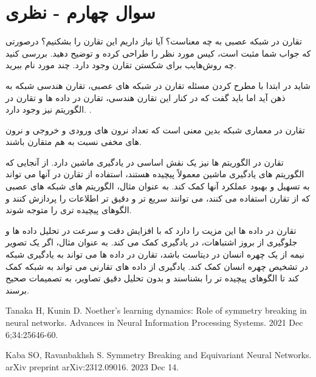 \section{سوال چهارم - نظری}
تقارن در شبکه عصبی به چه معناست؟ آیا نیاز داریم این تقارن را بشکنیم؟ درصورتی که جواب شما مثبت است، کیس مورد نظر را طراحی کرده و توضیح دهید. بررسی کنید چه روش‌هایب برای شکستن تقارن وجود دارد. چند مورد نام ببرید.





\begin{qsolve}
 	شاید در ابتدا با مطرح کردن مسئله تقارن در شبکه های عصبی، تقارن هندسی شبکه به ذهن آید اما باید گفت که در کنار این تقارن هندسی، تقارن در داده ها و تقارن در الگوریتم نیز وجود دارد. \cite{ref1}.
 	
 	تقارن در معماری شبکه بدین معنی است که تعداد نرون های ورودی و خروجی و نرون های مخفی نسبت به هم متقارن باشند. 
 	
 	تقارن در الگوریتم ها نیز یک نقش اساسی در یادگیری ماشین دارد. از آنجایی که الگوریتم های یادگیری ماشین معمولاً پیچیده هستند، استفاده از تقارن در آنها می تواند به تسهیل و بهبود عملکرد آنها کمک کند. به عنوان مثال، الگوریتم های شبکه های عصبی که از تقارن استفاده می کنند، می توانند سریع تر و دقیق تر اطلاعات را پردازش کنند و الگوهای پیچیده تری را متوجه شوند.
 	
 	تقارن در داده ها این مزیت را دارد که با افزایش دقت و سرعت در تحلیل داده ها و جلوگیری از بروز اشتباهات، در یادگیری کمک می کند. به عنوان مثال، اگر یک تصویر نیمه از یک چهره انسان در دیتاست باشد، تقارن در داده ها می تواند به یادگیری شبکه در تشخیص چهره انسان کمک کند. یادگیری از داده های تقارنی می تواند به شبکه کمک کند تا الگوهای پیچیده تر را بشناسند و بدون تحلیل دقیق تصاویر، به تصمیمات صحیح برسند.
 	
 	



\end{qsolve}

















\begin{latin}
	\begin{thebibliography}{9}
		Tanaka H, Kunin D. Noether’s learning dynamics: Role of symmetry breaking in neural networks. Advances in Neural Information Processing Systems. 2021 Dec 6;34:25646-60.
		
		Kaba SO, Ravanbakhsh S. Symmetry Breaking and Equivariant Neural Networks. arXiv preprint arXiv:2312.09016. 2023 Dec 14.
	\end{thebibliography} 
\end{latin}